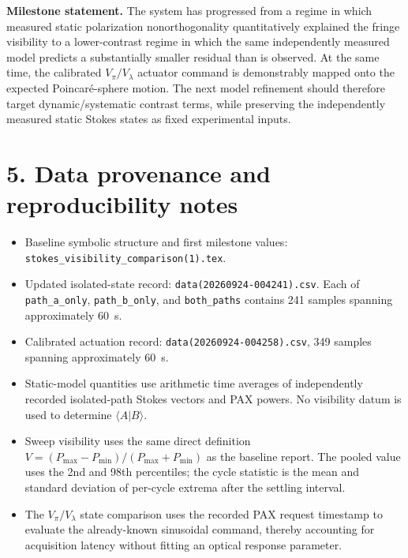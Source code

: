 \documentclass[10pt]{article}
\begin{document}
\begin{tcolorbox}[colback=light,colframe=navy,boxrule=0.6pt,arc=1.5pt,left=6pt,right=6pt,top=5pt,bottom=5pt]
\textbf{Milestone statement.} The system has progressed from a regime in which measured static polarization nonorthogonality quantitatively explained the fringe visibility to a lower-contrast regime in which the same independently measured model predicts a substantially smaller residual than is observed. At the same time, the calibrated $V_\pi/V_\lambda$ actuator command is demonstrably mapped onto the expected Poincar\'e-sphere motion. The next model refinement should therefore target dynamic/systematic contrast terms, while preserving the independently measured static Stokes states as fixed experimental inputs.
\end{tcolorbox}

\section*{5. Data provenance and reproducibility notes}
\begin{itemize}[leftmargin=1.4em,itemsep=2pt,topsep=2pt]
\item Baseline symbolic structure and first milestone values: \texttt{stokes\_visibility\_comparison(1).tex}.
\item Updated isolated-state record: \texttt{data(20260924-004241).csv}. Each of \texttt{path\_a\_only}, \texttt{path\_b\_only}, and \texttt{both\_paths} contains 241 samples spanning approximately \SI{60}{s}.
\item Calibrated actuation record: \texttt{data(20260924-004258).csv}, 349 samples spanning approximately \SI{60}{s}.
\item Static-model quantities use arithmetic time averages of independently recorded isolated-path Stokes vectors and PAX powers. No visibility datum is used to determine $\langle A|B\rangle$.
\item Sweep visibility uses the same direct definition $V=(P_{\max}-P_{\min})/(P_{\max}+P_{\min})$ as the baseline report. The pooled value uses the 2nd and 98th percentiles; the cycle statistic is the mean and standard deviation of per-cycle extrema after the settling interval.
\item The $V_\pi/V_\lambda$ state comparison uses the recorded PAX request timestamp to evaluate the already-known sinusoidal command, thereby accounting for acquisition latency without fitting an optical response parameter.
\end{itemize}
\end{document}

